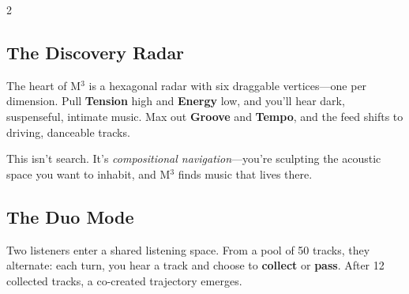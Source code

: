 \documentclass[10pt,a4paper]{article}
\begin{document}
\vspace{8pt}

\begin{multicols}{2}

\subsection{The Discovery Radar}

The heart of M$^3$ is a hexagonal radar with six draggable vertices---one per dimension. Pull \textbf{Tension} high and \textbf{Energy} low, and you'll hear dark, suspenseful, intimate music. Max out \textbf{Groove} and \textbf{Tempo}, and the feed shifts to driving, danceable tracks.

This isn't search. It's \emph{compositional navigation}---you're sculpting the acoustic space you want to inhabit, and M$^3$ finds music that lives there.

\subsection{The Duo Mode}

Two listeners enter a shared listening space. From a pool of 50 tracks, they alternate: each turn, you hear a track and choose to \textbf{collect} or \textbf{pass}. After 12 collected tracks, a co-created trajectory emerges.

\begin{center}
\end{center}


\end{multicols}
\end{document}
